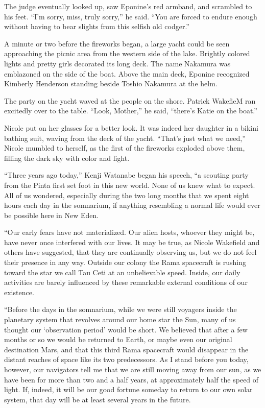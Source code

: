 \documentclass[]{article}
\begin{document}
{The judge eventually looked up, saw Eponine’s red armband, and scrambled to his feet.  “I’m sorry, miss, truly sorry,” he said.  “You are forced to endure enough without having to bear slights from this selfish old codger.”

A minute or two before the fireworks began, a large yacht could be seen approaching the picnic area from the western side of the lake.  Brightly colored lights and pretty girls decorated its long deck.  The name Nakamura was emblazoned on the side of the boat.  Above the main deck, Eponine recognized Kimberly Henderson standing beside Toshio Nakamura at the helm.

The party on the yacht waved at the people on the shore.  Patrick WakefieM ran excitedly over to the table.  “Look, Mother,” he said, “there’s Katie on the boat.”

Nicole put on her glasses for a better look.  It was indeed her daughter in a bikini bathing suit, waving from the deck of the yacht.  “That’s just what we need,” Nicole mumbled to herself, as the first of the fireworks exploded above them, filling the dark sky with color and light.

“Three years ago today,” Kenji Watanabe began his speech, “a scouting party from the Pinta first set foot in this new world.  None of us knew what to expect.  All of us wondered, especially during the two long months that we spent eight hours each day in the somnarium, if anything resembling a normal life would ever be possible here in New Eden.

“Our early fears have not materialized.  Our alien hosts, whoever they might be, have never once interfered with our lives.  It may be true, as Nicole Wakefield and others have suggested, that they are continually observing us, but we do not feel their presence in any way.  Outside our colony the Rama spacecraft is rushing toward the star we call Tau Ceti at an unbelievable speed.  Inside, our daily activities are barely influenced by these remarkable external conditions of our existence.

“Before the days in the somnarium, while we were still voyagers inside the planetary system that revolves around our home star the Sun, many of us thought our ‘observation period’ would be short.  We believed that after a few months or so we would be returned to Earth, or maybe even our original destination Mars, and that this third Rama spacecraft would disappear in the distant reaches of space like its two predecessors.  As I stand before you today, however, our navigators tell me that we are still moving away from our sun, as we have been for more than two and a half years, at approximately half the speed of light.  If, indeed, it will be our good fortune someday to return to our own solar system, that day will be at least several years in the future.

}
\end{document}
